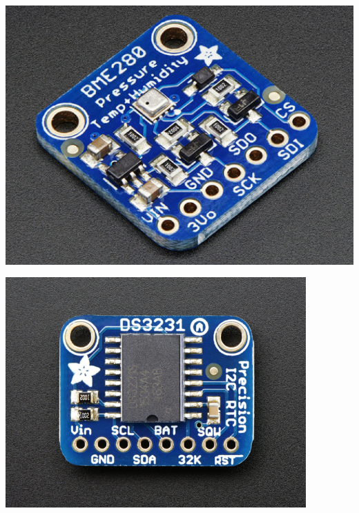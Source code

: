 {\begin{minipage}[b][5cm][t]{0.3\textwidth}
\centering
\includegraphics[width=\textwidth]{graphics/prototyping/bme280.PNG} 
\label{fig:bme280_breakoutboard}
\end{minipage}}
{\begin{minipage}[b][5cm][t]{0.3\textwidth}
\centering
\includegraphics[width=\textwidth]{graphics/prototyping/DS3231.png} 
\label{fig:ds3231_breakoutboard}
\end{minipage}}

